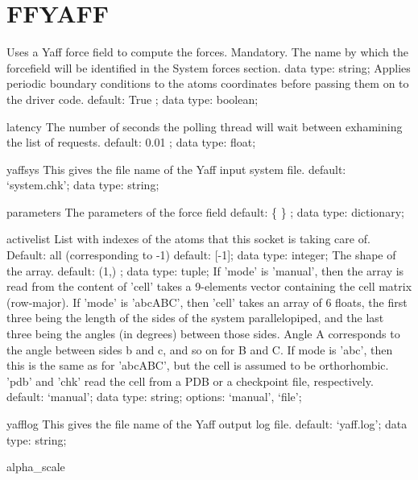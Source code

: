 \section{FFYAFF}
\label{FFYAFF}
\begin{ipifield}{}%
{Uses a Yaff force field to compute the forces.}%
{}%
{%
{Mandatory. The name by which the forcefield will be identified in the System forces section.}%
{data type: string; }%
%
{Applies periodic boundary conditions to the atoms coordinates before passing them on to the driver code.}%
{default:  True ; data type: boolean; }%
}
\begin{ipifield}{latency}%
{The number of seconds the polling thread will wait between exhamining the list of requests.}%
{default:  0.01 ; data type: float; }%
{}
\end{ipifield}
\begin{ipifield}{yaffsys}%
{This gives the file name of the Yaff input system file.}%
{default: `system.chk'; data type: string; }%
{}
\end{ipifield}
\begin{ipifield}{parameters}%
{The parameters of the force field}%
{default:  \{ \} ; data type: dictionary; }%
{}
\end{ipifield}
\begin{ipifield}{activelist}%
{List with indexes of the atoms that this socket is taking care of.    Default: all (corresponding to -1)}%
{default: 
      [-1]; data type: integer; }%
{%
{The shape of the array.}%
{default:  (1,) ; data type: tuple; }%
%
{If 'mode' is 'manual', then the array is read from the content of 'cell' takes a 9-elements vector containing the cell matrix (row-major). If 'mode' is 'abcABC', then 'cell' takes an array of 6 floats, the first three being the length of the sides of the system parallelopiped, and the last three being the angles (in degrees) between those sides. Angle A corresponds to the angle between sides b and c, and so on for B and C. If mode is 'abc', then this is the same as for 'abcABC', but the cell is assumed to be orthorhombic. 'pdb' and 'chk' read the cell from a PDB or a checkpoint file, respectively.}%
{default: `manual'; data type: string; options: `manual', `file'; }%
}
\end{ipifield}
\begin{ipifield}{yafflog}%
{This gives the file name of the Yaff output log file.}%
{default: `yaff.log'; data type: string; }%
{}
\end{ipifield}
\begin{ipifield}{alpha\_scale}%

\end{ipifield}
\end{ipifield}
